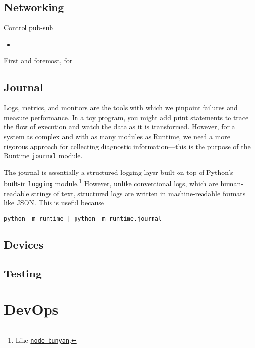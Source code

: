 \documentclass[12pt]{book}
\begin{document}
  \section{Networking}

  Control pub-sub
  \begin{itemize}
    \item \texttt{}
  \end{itemize}

  First and foremost, for

  \section{Journal}

  Logs, metrics, and monitors are the tools with which we pinpoint failures and measure performance.
  In a toy program, you might add print statements to trace the flow of execution and watch the data as it is transformed.
  However, for a system as complex and with as many modules as Runtime, we need a more rigorous approach for collecting diagnostic information---this is the purpose of the Runtime \texttt{journal} module.

  The journal is essentially a structured logging layer built on top of Python's built-in \texttt{logging} module.\footnote{Like \href{https://github.com/trentm/node-bunyan}{\texttt{node-bunyan}}.}
  However, unlike conventional logs, which are human-readable strings of text, \href{https://stackify.com/what-is-structured-logging-and-why-developers-need-it/}{structured logs} are written in machine-readable formats like \href{https://www.json.org/}{JSON}.
  This is useful because

  \begin{lstlisting}[gobble=4]
    python -m runtime | python -m runtime.journal
  \end{lstlisting}

  \section{Devices}

  \section{Testing}

  \chapter{DevOps}
\end{document}
